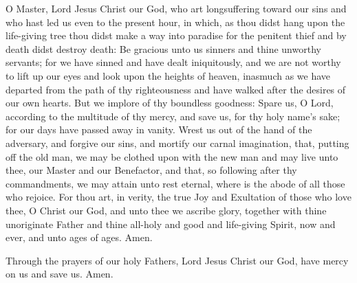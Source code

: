 O Master, Lord Jesus Christ our God, who art longsuffering toward our sins and who hast led us even to the present hour, in which, as thou didst hang upon the life-giving tree thou didst make a way into paradise for the penitent thief and by death didst destroy death: Be gracious unto us sinners and thine unworthy servants; for we have sinned and have dealt iniquitously, and we are not worthy to lift up our eyes and look upon the heights of heaven, inasmuch as we have departed from the path of thy righteousness and have walked after the desires of our own hearts. But we implore of thy boundless goodness: Spare us, O Lord, according to the multitude of thy mercy, and save us, for thy holy name's sake; for our days have passed away in vanity. Wrest us out of the hand of the adversary, and forgive our sins, and mortify our carnal imagination, that, putting off the old man, we may be clothed upon with the new man and may live unto thee, our Master and our Benefactor, and that, so following after thy commandments, we may attain unto rest eternal, where is the abode of all those who rejoice. For thou art, in verity, the true Joy and Exultation of those who love thee, O Christ our God, and unto thee we ascribe glory, together with thine unoriginate Father and thine all-holy and good and life-giving Spirit, now and ever, and unto ages of ages. Amen.

Through the prayers of our holy Fathers, Lord Jesus Christ our God, have mercy on us and save us. Amen.

\cleardoublepage

